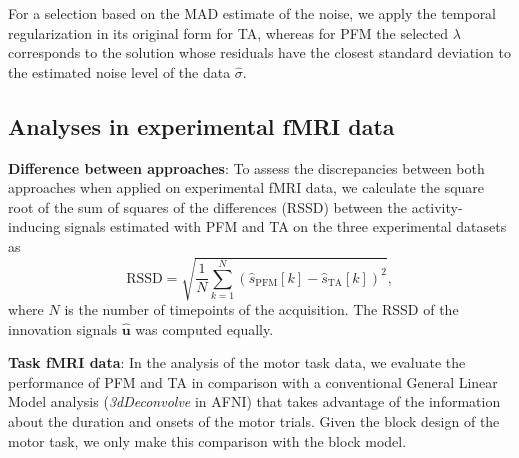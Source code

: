 For a selection based on the MAD estimate of the noise, we apply the temporal
regularization in its original form for TA, whereas for PFM the selected
$\lambda$ corresponds to the solution whose residuals have the closest standard
deviation to the estimated noise level of the data $\hat{\sigma}$.  %

\subsection{Analyses in experimental fMRI data}

\textbf{Difference between approaches}: To assess the discrepancies between both
approaches when applied on experimental fMRI data, we calculate the square root
of the sum of squares of the differences (RSSD) between the activity-inducing
signals estimated with PFM and TA on the three experimental datasets as
\begin{equation}
    \text{RSSD} = \sqrt{\frac{1}{N} \sum_{k=1}^N (\hat{s}_\text{PFM}[k] - \hat{s}_\text{TA}[k])^2},
\end{equation}
where $N$ is the number of timepoints of the acquisition. The RSSD of the
innovation signals $\mathbf{\hat{u}}$ was computed equally.

\textbf{Task fMRI data}: In the analysis of the motor task data, we evaluate the
performance of PFM and TA in comparison with a conventional General Linear Model
analysis (\textit{3dDeconvolve} in AFNI) that takes advantage of the information
about the duration and onsets of the motor trials. Given the block design of the
motor task, we only make this comparison with the block model.

